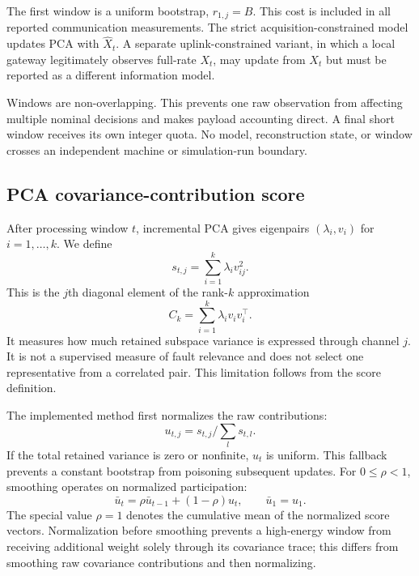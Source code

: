 \documentclass[12pt]{article}
\begin{document}
The first window is a uniform bootstrap, $r_{1,j}=B$. This cost is included in
all reported communication measurements. The strict acquisition-constrained
model updates PCA with $\widehat X_t$. A separate uplink-constrained variant,
in which a local gateway legitimately observes full-rate $X_t$, may update from
$X_t$ but must be reported as a different information model.

Windows are non-overlapping. This prevents one raw observation from affecting
multiple nominal decisions and makes payload accounting direct. A final short
window receives its own integer quota. No model, reconstruction state, or
window crosses an independent machine or simulation-run boundary.

\subsection{PCA covariance-contribution score}

After processing window $t$, incremental PCA gives eigenpairs
$(\lambda_i,v_i)$ for $i=1,\ldots,k$. We define
\begin{equation}
 s_{t,j}=\sum_{i=1}^{k}\lambda_i v_{ij}^{2}.
\label{eq:score}
\end{equation}
This is the $j$th diagonal element of the rank-$k$ approximation
\begin{equation}
 C_k=\sum_{i=1}^k\lambda_i v_iv_i^\top.
\end{equation}
It measures how much retained
subspace variance is expressed through channel $j$. It is not a supervised
measure of fault relevance and does not select one representative from a
correlated pair. This limitation follows from the score definition.

The implemented method first normalizes the raw contributions:
\begin{equation}
 u_{t,j}=s_{t,j}/\sum_l s_{t,l}.
\end{equation}
If the total retained variance is zero or nonfinite, $u_t$ is uniform. This
fallback prevents a constant bootstrap from poisoning subsequent updates.
For $0\leq\rho<1$, smoothing operates on normalized participation:
\begin{equation}
 \bar u_t=\rho\bar u_{t-1}+(1-\rho)u_t,
 \qquad \bar u_1=u_1.
\end{equation}
The special value $\rho=1$ denotes the cumulative mean of the normalized score
vectors. Normalization before smoothing prevents a high-energy window from
receiving additional weight solely through its covariance trace; this differs
from smoothing raw covariance contributions and then normalizing.
\end{document}

